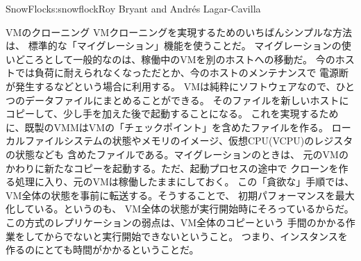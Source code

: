 \begin{aosachapter}{SnowFlock}{s:snowflock}{Roy Bryant and Andr\'e{s} Lagar-Cavilla}
\begin{aosasect1}{VMのクローニング}
VMクローニングを実現するためのいちばんシンプルな方法は、
標準的な「マイグレーション」機能を使うことだ。
マイグレーションの使いどころとして一般的なのは、稼働中のVMを別のホストへの移動だ。
今のホストでは負荷に耐えられなくなっただとか、今のホストのメンテナンスで
電源断が発生するなどという場合に利用する。
VMは純粋にソフトウェアなので、ひとつのデータファイルにまとめることができる。
そのファイルを新しいホストにコピーして、少し手を加えた後で起動することになる。
これを実現するために、既製のVMMはVMの「チェックポイント」を含めたファイルを作る。
ローカルファイルシステムの状態やメモリのイメージ、仮想CPU(VCPU)のレジスタの状態なども
含めたファイルである。マイグレーションのときは、
元のVMのかわりに新たなコピーを起動する。ただ、起動プロセスの途中で
クローンを作る処理に入り、元のVMは稼働したままにしておく。
この「貪欲な」手順では、VM全体の状態を事前に転送する。そうすることで、
初期パフォーマンスを最大化している。というのも、
VM全体の状態が実行開始時にそろっているからだ。
この方式のレプリケーションの弱点は、VM全体のコピーという
手間のかかる作業をしてからでないと実行開始できないということ。
つまり、インスタンスを作るのにとても時間がかかるということだ。


\end{aosasect1}
\end{aosachapter}
